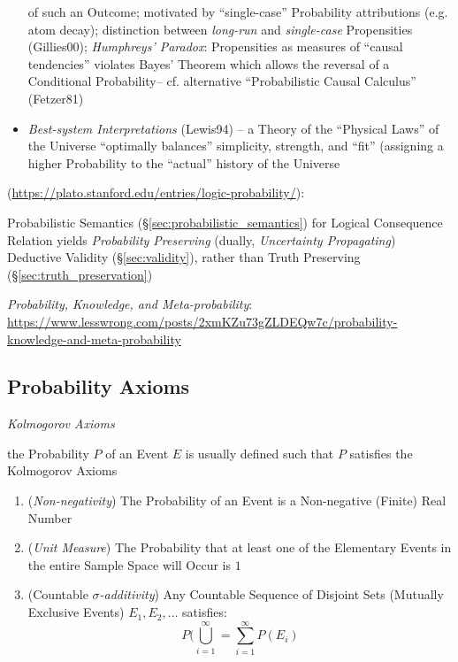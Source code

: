 \begin{itemize}
    of such an Outcome; motivated by ``single-case'' Probability attributions
    (e.g. atom decay); distinction between \emph{long-run} and
    \emph{single-case} Propensities (Gillies00); \emph{Humphreys' Paradox}:
    Propensities as measures of ``causal tendencies'' violates Bayes' Theorem
    which allows the reversal of a Conditional Probability-- cf. alternative
    ``Probabilistic Causal Calculus'' (Fetzer81)
  \item \emph{Best-system Interpretations} (Lewis94) -- a Theory of the
    ``Physical Laws'' of the Universe ``optimally balances'' simplicity,
    strength, and ``fit'' (assigning a higher Probability to the ``actual''
    history of the Universe
\end{itemize}

(\url{https://plato.stanford.edu/entries/logic-probability/}):

Probabilistic Semantics (\S\ref{sec:probabilistic_semantics}) for Logical
Consequence Relation yields \emph{Probability Preserving} (dually,
\emph{Uncertainty Propagating}) Deductive Validity (\S\ref{sec:validity}),
rather than Truth Preserving (\S\ref{sec:truth_preservation})

\emph{Probability, Knowledge, and Meta-probability}:
\url{https://www.lesswrong.com/posts/2xmKZu73gZLDEQw7c/probability-knowledge-and-meta-probability}



\subsection{Probability Axioms}\label{sec:probability_axioms}

\emph{Kolmogorov Axioms}

the Probability $P$ of an Event $E$ is usually defined such that $P$ satisfies
the Kolmogorov Axioms

\begin{enumerate}
  \item (\emph{Non-negativity}) The Probability of an Event is a Non-negative
    (Finite) Real Number
  \item (\emph{Unit Measure}) The Probability that at least one of the
    Elementary Events in the entire Sample Space will Occur is $1$
  \item (Countable \emph{$\sigma$-additivity}) Any Countable Sequence of
    Disjoint Sets (Mutually Exclusive Events) $E_1, E_2, \ldots$ satisfies:
    \[
      P (\bigcup_{i=1}^\infty = \sum_{i=1}^\infty P(E_i)
    \]
\end{enumerate}

